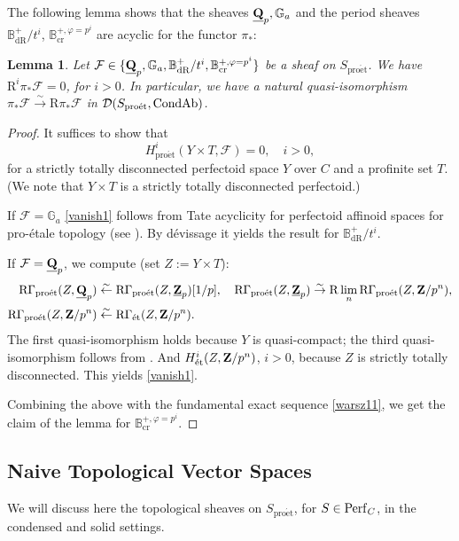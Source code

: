 \documentclass[10pt]{amsart}
\newtheorem{lemma}[equation]{Lemma}
\theoremstyle{definition}
\theoremstyle{remark}
\def\phi{\varphi}
\newcommand{\dr}{\operatorname{dR} }
\newcommand{\proeet}{\operatorname{pro\acute{e}t} }
\newcommand{\eet}{\operatorname{\acute{e}t} }
\newcommand{\crr}{\operatorname{cr} }
\newcommand{\sff}{{\mathcal{F}}}
\newcommand{\sd}{{\mathcal{D}}}
\numberwithin{equation}{section}
\def\R{{\mathrm R}}
\def\Q{{\bf Q}} \def\Z{{\bf Z}}
\numberwithin{equation}{section}
\begin{document}
  The following lemma shows that  the sheaves $\underline{\Q}_p, {\mathbb G}_a$ and the period sheaves 
  $\mathbb{B}^+_{\dr}/t^i$, $\mathbb{B}^{+,\phi=p^i}_{\crr}$ are acyclic for the functor $\pi_*$:
   \begin{lemma} \label{acyclic1}
Let $\sff\in\{\underline{\Q}_p, {\mathbb G}_a,  \mathbb{B}^+_{\dr}/t^i, \mathbb{B}^{+,\phi=p^i}_{\crr}\}$ be a sheaf on $S_{\proeet}$. We have 
 $\R^i\pi_*\sff=0$, for $i>0$.  
 In particular, we have a  natural quasi-isomorphism 
 $\pi_*\sff\stackrel{\sim}{\to} \R\pi_*\sff$
in $\sd(S_{\proeet},{\rm CondAb})$.
 \end{lemma}
 \begin{proof}
 It suffices to show that 
 \begin{equation}\label{vanish1}
 H^i_{\proeet}(Y\times T,\sff)=0, \quad i>0, 
 \end{equation}
  for a strictly totally disconnected perfectoid space $Y$ over $C$ and a profinite set $T$.  
(We note that $Y\times T$ is a strictly totally disconnected perfectoid.) 

  If $\sff={\mathbb G}_a$ \eqref{vanish1} follows  from Tate acyclicity for perfectoid affinoid spaces for pro-\'etale topology (see \cite[Prop. 8.8]{SchD}). By d\'evissage it yields the result for
   $\mathbb{B}^+_{\dr}/t^i$. 
  
 If $\sff=\underline{\Q}_p$,   we compute (set $Z:=Y\times T$):
 \begin{align*}
 \R\Gamma_{\proeet}(Z,\underline{\Q}_p) & \stackrel{\sim}{\leftarrow} \R\Gamma_{\proeet}(Z,\underline{\Z}_p)[1/p],\quad 
  \R\Gamma_{\proeet}(Z,\underline{\Z}_p)\stackrel{\sim}{\to} \R\lim_n\R\Gamma_{\proeet}(Z,{\Z}/p^n),\\
 \R\Gamma_{\proeet}(Z,{\Z}/p^n) & \stackrel{\sim}{\leftarrow} \R\Gamma_{\eet}(Z,{\Z}/p^n).
 \end{align*}
 The first quasi-isomorphism holds  because $Y$ is quasi-compact; the third quasi-isomorphism follows from \cite[Prop. 14.7, Prop. 14.8]{SchD}. And $H^i_{\eet}(Z,{\Z}/p^n)$, $i>0$, because $Z$ is strictly totally disconnected. This yields \eqref{vanish1}. 
 
  Combining the above with the fundamental exact sequence \eqref{warsz11}, we get the claim of the lemma for $\mathbb{B}^{+,\phi=p^i}_{\crr}$. 
 \end{proof}
\subsection{Naive Topological Vector Spaces}  \label{naive52} We will discuss here the topological sheaves on $S_{\proeet}$, for $S\in {\rm Perf}_C$,  in the condensed and solid settings. 
\end{document}
